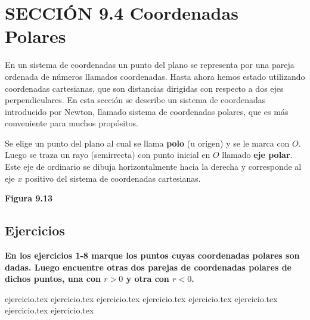 
\section*{SECCIÓN 9.4 \quad Coordenadas Polares}

En un sistema de coordenadas un punto del plano se representa por una pareja ordenada de números llamados coordenadas. Hasta ahora hemos estado utilizando coordenadas cartesianas, que son distancias dirigidas con respecto a dos ejes perpendiculares. En esta sección se describe un sistema de coordenadas introducido por Newton, llamado sistema de coordenadas polares, que es más conveniente para muchos propósitos.

Se elige un punto del plano al cual se llama \textbf{polo} (u origen) y se le marca con $O$. Luego se traza un rayo (semirrecta) con punto inicial en $O$ llamado \textbf{eje polar}. Este eje de ordinario se dibuja horizontalmente hacia la derecha y corresponde al eje $x$ positivo del sistema de coordenadas cartesianas.

\begin{center}
\textbf{Figura 9.13}
\vspace{0.2cm}

\end{center}

\subsection*{Ejercicios}

\noindent\textbf{En los ejercicios 1-8 marque los puntos cuyas coordenadas polares son dadas. Luego encuentre otras dos parejas de coordenadas polares de dichos puntos, una con $r > 0$ y otra con $r < 0$.}
\begin{enumerate}
    {ejercicio.tex}
{ejercicio.tex}
{ejercicio.tex}
{ejercicio.tex}
{ejercicio.tex}
{ejercicio.tex}
{ejercicio.tex}
{ejercicio.tex}
\end{enumerate}

